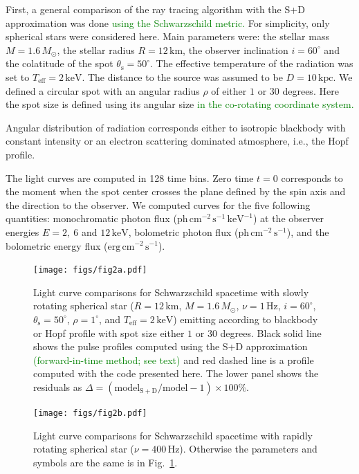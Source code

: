 \documentclass{aa}
\newcommand{\refe}[1]{\textcolor{green}{{#1}}}
\newcommand{\refedel}[1]{}
\newcommand{\sch}{Schwarzschild }
\newcommand{\Msun}{\ensuremath{M_{\odot}}}
\begin{document}
First, a general comparison of the ray tracing algorithm with the S+D approximation was done \refe{using the \sch metric.}
For simplicity, only spherical stars were considered here.
Main parameters were: the stellar mass $M = 1.6\,\Msun$, the stellar radius $R = 12\,\mathrm{km}$, the observer inclination $i = 60^{\circ}$ and the colatitude of the spot $\theta_{\mathrm{s}} = 50^{\circ}$.  
The effective temperature of the radiation was set to $T_{\mathrm{eff}} = 2\,\mathrm{keV}$.  
The distance to the source was assumed to be $D = 10\,\mathrm{kpc}$.  
We defined a circular spot with an angular radius $\rho$ of either $1$ or $30$ degrees.
Here the spot size is defined using its angular size \refe{in the co-rotating coordinate system.}
\refedel{Hence, the spot size is measured using the \textit{angular} size, not the \textit{spatial} size.}
Angular distribution of radiation corresponds either to isotropic blackbody with constant intensity or an electron scattering dominated atmosphere, i.e., the Hopf profile.


The light curves are computed in 128 time bins.  Zero time $t = 0$ corresponds to the moment when the spot center crosses the plane defined by the spin axis and the direction to the observer.  
We computed curves for the five following quantities: monochromatic photon flux ($\mathrm{ph}\,\mathrm{cm}^{-2}\,\mathrm{s}^{-1}\,\mathrm{keV}^{-1}$) at the observer energies $E = 2,~6$ and $12\,\mathrm{keV}$, bolometric photon flux ($\mathrm{ph}\,\mathrm{cm}^{-2}\,\mathrm{s}^{-1}$), and the bolometric energy flux ($\mathrm{erg}\,\mathrm{cm}^{-2}\,\mathrm{s}^{-1}$).


\begin{figure}
\centering
\texttt{[image: figs/fig2a.pdf]}
\caption{\label{fig:sch_comp1}
  Light curve comparisons for \sch spacetime with slowly rotating spherical star ($R = 12\,\mathrm{km}$, $M = 1.6\,\Msun$, $\nu = 1\,\mathrm{Hz}$, $i = 60^{\circ}$, $\theta_{\mathrm{s}} = 50^{\circ}$, $\rho = 1^{\circ}$, and $T_{\mathrm{eff}} = 2\,\mathrm{keV}$) emitting according to blackbody or Hopf profile with spot size either $1$ or $30$ degrees.
    Black solid line shows the pulse profiles computed using the S+D approximation \refe{(forward-in-time method; see text)} and red dashed line is a profile computed with the code presented here.
  The lower panel shows the residuals as $\Delta = (\mathrm{model_{S+D}}/\mathrm{model} -1) \times 100\%$.
}
\end{figure}

\begin{figure}
\centering
\texttt{[image: figs/fig2b.pdf]}
\caption{\label{fig:sch_comp400}
  Light curve comparisons for \sch spacetime with rapidly rotating spherical star ($\nu = 400\,\mathrm{Hz}$).
  Otherwise the parameters and symbols are the same is in Fig.~\ref{fig:sch_comp1}.
}
\end{figure}
\end{document}
